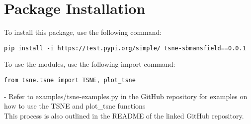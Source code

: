 \documentclass{article}
\begin{document}
\section*{Package Installation}

To install this package, use the following command:
\begin{verbatim}
pip install -i https://test.pypi.org/simple/ tsne-sbmansfield==0.0.1
\end{verbatim}

To use the modules, use the following import command:
\begin{verbatim}
from tsne.tsne import TSNE, plot_tsne
\end{verbatim}

- Refer to examples/tsne-examples.py in the GitHub repository for examples on how to use the TSNE and plot\_tsne functions\\

This process is also outlined in the README of the linked GitHub repository.
\end{document}
